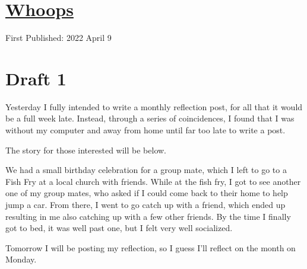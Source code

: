 \documentclass[12pt]{article}[titlepage]
\newcommand{\1}{\={a}}
\newcommand{\2}{\={e}}
\newcommand{\3}{\={\i}}
\newcommand{\4}{\=o}
\newcommand{\5}{\=u}
\newcommand{\6}{\={A}}
\renewcommand{\,}{\textsuperscript{,}}
\begin{document}
\doublespacing
\section{\href{whoops-3}{Whoops}}
First Published: 2022 April 9


\section{Draft 1}
Yesterday I fully intended to write a monthly reflection post, for all that it would be a full week late.
Instead, through a series of coincidences, I found that I was without my computer and away from home until far too late to write a post.

The story for those interested will be below.

We had a small birthday celebration for a group mate, which I left to go to a Fish Fry at a local church with friends.
While at the fish fry, I got to see another one of my group mates, who asked if I could come back to their home to help jump a car.
From there, I went to go catch up with a friend, which ended up resulting in me also catching up with a few other friends.
By the time I finally got to bed, it was well past one, but I felt very well socialized.

Tomorrow I will be posting my reflection, so I guess I'll reflect on the month on Monday.
\end{document}
